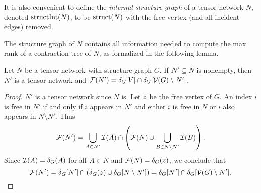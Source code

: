 It is also convenient to define the \emph{internal structure graph} of a tensor network $N$, denoted $\text{structInt}(N)$, to be $\text{struct}(N)$ with the free vertex (and all incident edges) removed.

The structure graph of $N$ contains all information needed to compute the max rank of a contraction-tree of $N$, as formalized in the following lemma.
\begin{lemma} \label{lemma:tcn-equiv-structure}
	Let $N$ be a tensor network with structure graph $G$. If $N' \subseteq N$ is nonempty, then $N'$ is a tensor network and $\mathcal{F}(N') = \delta_{G}[V] \cap \delta_{G}[\mathcal{V}(G) \setminus N']$.
\end{lemma}
\begin{proof}
	$N'$ is a tensor network since $N$ is. Let $z$ be the free vertex of $G$.
	An index $i$ is free in $N'$ if and only if $i$ appears in $N'$ and either $i$ is free in $N$ or $i$ also appears in $N \setminus N'$. Thus
    $$\mathcal{F}(N') = \bigcup_{A \in N'} \mathcal{I}(A) \cap \left( \mathcal{F}(N) \cup \bigcup_{B \in N \setminus N'} \mathcal{I}(B) \right).$$
	Since $\mathcal{I}(A) = \delta_{G}(A)$ for all $A \in N$ and $\mathcal{F}(N) = \delta_{G}(z)$, we conclude that
	$$\mathcal{F}(N') = \delta_{G}[N'] \cap (\delta_{G}(z) \cup \delta_{G}[N \setminus N']) =  \delta_{G}[N'] \cap \delta_{G}[\mathcal{V}(G) \setminus N'].$$
\end{proof}




